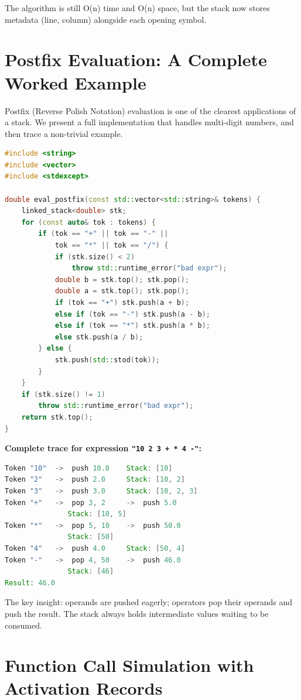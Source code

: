 The algorithm is still O(n) time and O(n) space, but the stack now stores metadata (line, column) alongside each opening symbol.

\section{Postfix Evaluation: A Complete Worked Example}

Postfix (Reverse Polish Notation) evaluation is one of the clearest applications of a stack. We present a full implementation that handles multi-digit numbers, and then trace a non-trivial example.

\begin{lstlisting}[language=C++]
#include <string>
#include <vector>
#include <stdexcept>

double eval_postfix(const std::vector<std::string>& tokens) {
    linked_stack<double> stk;
    for (const auto& tok : tokens) {
        if (tok == "+" || tok == "-" ||
            tok == "*" || tok == "/") {
            if (stk.size() < 2)
                throw std::runtime_error("bad expr");
            double b = stk.top(); stk.pop();
            double a = stk.top(); stk.pop();
            if (tok == "+") stk.push(a + b);
            else if (tok == "-") stk.push(a - b);
            else if (tok == "*") stk.push(a * b);
            else stk.push(a / b);
        } else {
            stk.push(std::stod(tok));
        }
    }
    if (stk.size() != 1)
        throw std::runtime_error("bad expr");
    return stk.top();
}
\end{lstlisting}

\textbf{Complete trace for expression \texttt{"10 2 3 + * 4 -"}:}

\begin{lstlisting}[language=Java]
Token "10"  ->  push 10.0    Stack: [10]
Token "2"   ->  push 2.0     Stack: [10, 2]
Token "3"   ->  push 3.0     Stack: [10, 2, 3]
Token "+"   ->  pop 3, 2     ->  push 5.0
               Stack: [10, 5]
Token "*"   ->  pop 5, 10    ->  push 50.0
               Stack: [50]
Token "4"   ->  push 4.0     Stack: [50, 4]
Token "-"   ->  pop 4, 50    ->  push 46.0
               Stack: [46]
Result: 46.0
\end{lstlisting}

The key insight: operands are pushed eagerly; operators pop their operands and push the result. The stack always holds intermediate values waiting to be consumed.

\section{Function Call Simulation with Activation Records}


